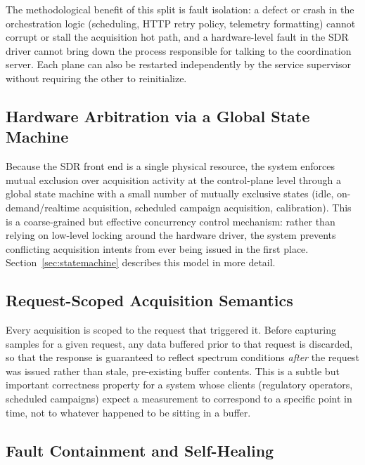\documentclass[11pt,a4paper]{article}
\begin{document}
The methodological benefit of this split is fault isolation: a defect or crash in the
orchestration logic (scheduling, HTTP retry policy, telemetry formatting) cannot corrupt or
stall the acquisition hot path, and a hardware-level fault in the SDR driver cannot bring down
the process responsible for talking to the coordination server. Each plane can also be
restarted independently by the service supervisor without requiring the other to reinitialize.

\subsection{Hardware Arbitration via a Global State Machine}

Because the SDR front end is a single physical resource, the system enforces mutual exclusion
over acquisition activity at the control-plane level through a global state machine with a
small number of mutually exclusive states (idle, on-demand/realtime acquisition, scheduled
campaign acquisition, calibration). This is a coarse-grained but effective concurrency
control mechanism: rather than relying on low-level locking around the hardware driver, the
system prevents conflicting acquisition intents from ever being issued in the first place.
Section~\ref{sec:statemachine} describes this model in more detail.

\subsection{Request-Scoped Acquisition Semantics}

Every acquisition is scoped to the request that triggered it. Before capturing samples for a
given request, any data buffered prior to that request is discarded, so that the response is
guaranteed to reflect spectrum conditions \emph{after} the request was issued rather than
stale, pre-existing buffer contents. This is a subtle but important correctness property for
a system whose clients (regulatory operators, scheduled campaigns) expect a measurement to
correspond to a specific point in time, not to whatever happened to be sitting in a buffer.

\subsection{Fault Containment and Self-Healing}
\end{document}
